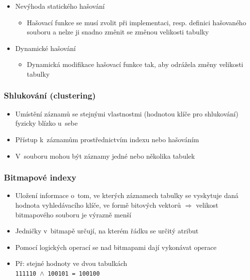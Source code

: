 \documentclass[a4paper,10pt]{article}
\newcommand{\tedy}{$\Rightarrow$ }
\begin{document}
\begin{itemize}
					\item Nevýhoda statického hašování
					\begin{itemize}
						\item Hašovací funkce se musí zvolit při implementaci, resp. definici hašovaného souboru a nelze ji snadno změnit se změnou velikosti tabulky
					\end{itemize}

					\item Dynamické hašování
					\begin{itemize}
						\item Dynamická modifikace hašovací funkce tak, aby odrážela změny velikosti tabulky
					\end{itemize}
				\end{itemize}

			\subsubsection{Shlukování (clustering)}
				\begin{itemize}
					\item Umístění záznamů se stejnými vlastnostmi (hodnotou klíče pro shlukování) fyzicky blízko u~sebe
					\item Přístup k~záznamům prostřednictvím indexu nebo hašováním
					\item V~souboru mohou být záznamy jedné nebo několika tabulek
				\end{itemize} 
			\subsubsection{Bitmapové indexy}
				\begin{itemize}
					\item Uložení informace o~tom, ve kterých záznamech tabulky se vyskytuje daná hodnota vyhledávacího klíče, ve formě bitových vektorů \tedy velikost bitmapového souboru je výrazně menší
					\item Jedničky v~bitmapě určují, na kterém řádku se určitý atribut
					\item Pomocí logických operací se nad bitmapami dají vykonávat operace
					\item Př: stejné hodnoty ve dvou tabulkách \\
					\texttt{111110 $\land$ 100101 = 100100}
				\end{itemize}
\end{document}
